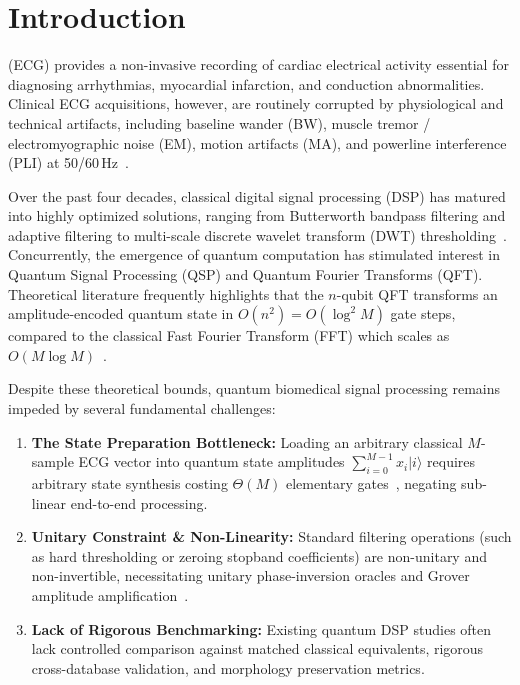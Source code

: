 \documentclass[journal,compsoc]{IEEEtran}
\begin{document}
\maketitle
\IEEEdisplaynontitleabstractindextext
\IEEEpeerreviewmaketitle

\section{Introduction}
 (ECG) provides a non-invasive recording of cardiac electrical activity essential for diagnosing arrhythmias, myocardial infarction, and conduction abnormalities. Clinical ECG acquisitions, however, are routinely corrupted by physiological and technical artifacts, including baseline wander (BW), muscle tremor / electromyographic noise (EM), motion artifacts (MA), and powerline interference (PLI) at 50/60\,Hz~\cite{sornmo2005bioelectrical,clifford2006advanced}. 

Over the past four decades, classical digital signal processing (DSP) has matured into highly optimized solutions, ranging from Butterworth bandpass filtering and adaptive filtering to multi-scale discrete wavelet transform (DWT) thresholding~\cite{daubechies1992ten,pantompkins1985}. Concurrently, the emergence of quantum computation has stimulated interest in Quantum Signal Processing (QSP) and Quantum Fourier Transforms (QFT). Theoretical literature frequently highlights that the $n$-qubit QFT transforms an amplitude-encoded quantum state in $O(n^2) = O(\log^2 M)$ gate steps, compared to the classical Fast Fourier Transform (FFT) which scales as $O(M \log M)$~\cite{cooley1965algorithm,nielsenchuang2010}.

Despite these theoretical bounds, quantum biomedical signal processing remains impeded by several fundamental challenges:
\begin{enumerate}
    \item \textbf{The State Preparation Bottleneck:} Loading an arbitrary classical $M$-sample ECG vector into quantum state amplitudes $\sum_{i=0}^{M-1} x_i |i\rangle$ requires arbitrary state synthesis costing $\Theta(M)$ elementary gates~\cite{shende2006synthesis,aaronson2015read}, negating sub-linear end-to-end processing.
    \item \textbf{Unitary Constraint \& Non-Linearity:} Standard filtering operations (such as hard thresholding or zeroing stopband coefficients) are non-unitary and non-invertible, necessitating unitary phase-inversion oracles and Grover amplitude amplification~\cite{grover1996,brassard2002quantum}.
    \item \textbf{Lack of Rigorous Benchmarking:} Existing quantum DSP studies often lack controlled comparison against matched classical equivalents, rigorous cross-database validation, and morphology preservation metrics.
\end{enumerate}
\end{document}
